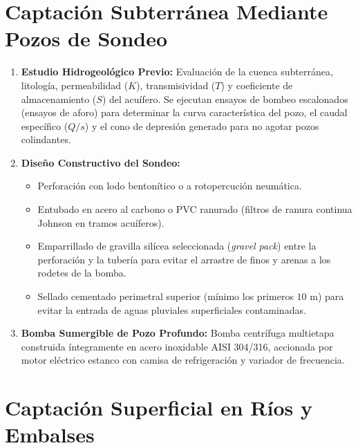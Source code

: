 \documentclass{report}
\begin{document}
\section{Captación Subterránea Mediante Pozos de Sondeo}

\begin{enumerate}

    \item \textbf{Estudio Hidrogeológico Previo:} Evaluación de la cuenca subterránea, litología, permeabilidad ($K$), transmisividad ($T$) y coeficiente de almacenamiento ($S$) del acuífero. Se ejecutan ensayos de bombeo escalonados (ensayos de aforo) para determinar la curva característica del pozo, el caudal específico ($Q/s$) y el cono de depresión generado para no agotar pozos colindantes.

    \item \textbf{Diseño Constructivo del Sondeo:}

    \begin{itemize}

        \item Perforación con lodo bentonítico o a rotopercución neumática.

        \item Entubado en acero al carbono o PVC ranurado (filtros de ranura continua Johnson en tramos acuíferos).

        \item Emparrillado de gravilla silícea seleccionada (\textit{gravel pack}) entre la perforación y la tubería para evitar el arrastre de finos y arenas a los rodetes de la bomba.

        \item Sellado cementado perimetral superior (mínimo los primeros $10\text{ m}$) para evitar la entrada de aguas pluviales superficiales contaminadas.

    \end{itemize}

    \item \textbf{Bomba Sumergible de Pozo Profundo:} Bomba centrífuga multietapa construida íntegramente en acero inoxidable AISI 304/316, accionada por motor eléctrico estanco con camisa de refrigeración y variador de frecuencia.

\end{enumerate}



\section{Captación Superficial en Ríos y Embalses}
\end{document}

